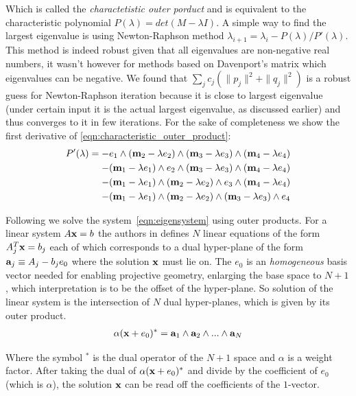 \documentclass{birkjour}
\numberwithin{equation}{section}
\begin{document}
Which is called the \emph{charactetistic outer porduct} and is equivalent to the characteristic polynomial $P(\lambda) = det(M - \lambda I)$. A simple way to find the largest eigenvalue is using Newton-Raphson method $\lambda_{i+1} = \lambda_i - P(\lambda) / P'(\lambda)$. This method is indeed robust given that all eigenvalues are non-negative real numbers, it wasn't however for methods based on Davenport's matrix \cite{Davenport1968} which eigenvalues can be negative. We found that $\sum_j { c_{j} (\|p_j\|^2 + \|q_j\|^2) }$ is a robust guess for Newton-Raphson iteration because it is close to largest eigenvalue (under certain input it is the actual largest eigenvalue, as discussed earlier) and thus converges to it in few iterations. For the sake of completeness we show the first derivative of \ref{eqn:characteristic_outer_product}:
\begin{eqnarray*}
P'(\lambda) = 
- e_1\wedge(\textbf m_2 - \lambda e_2)\wedge(\textbf m_3 - \lambda e_3)\wedge(\textbf m_4- \lambda e_4)\\
- (\textbf m_1 - \lambda e_1)\wedge e_2\wedge(\textbf m_3 - \lambda e_3)\wedge(\textbf m_4- \lambda e_4)\\
- (\textbf m_1 - \lambda e_1)\wedge(\textbf m_2 - \lambda e_2)\wedge e_3\wedge(\textbf m_4- \lambda e_4)\\
- (\textbf m_1 - \lambda e_1)\wedge(\textbf m_2 - \lambda e_2)\wedge(\textbf m_3 - \lambda e_3)\wedge e_4
\end{eqnarray*}

Following \cite{DeKeninck2019} we solve the system~\ref{eqn:eigensystem} using outer products. For a linear system $A \textbf x = b$ the authors in \cite{DeKeninck2019} defines $N$ linear equations of the form $A^T_j \textbf x = b_j$ each of which corresponds to a dual hyper-plane of the form $\textbf a_j \equiv A_j - b_j e_0$ where the solution $\textbf x$ must lie on. The $e_0$ is an \emph{homogeneous} basis vector needed for enabling projective geometry, enlarging the base space to $N+1$, which interpretation is to be the offset of the hyper-plane. So solution of the linear system is the intersection of $N$ dual hyper-planes, which is given by its outer product.
\begin{eqnarray}
\alpha (\textbf x + e_0)^* = \textbf a_1 \wedge \textbf a_2 \wedge ... \wedge \textbf a_N
\end{eqnarray}

Where the symbol $^*$ is the dual operator of the $N+1$ space and $\alpha$ is a weight factor. After taking the dual of $\alpha (\textbf x + e_0)^*$ and divide by the coefficient of $e_0$ (which is $\alpha$), the solution $\textbf x$ can be read off the coefficients of the $1$-vector.
\end{document}
